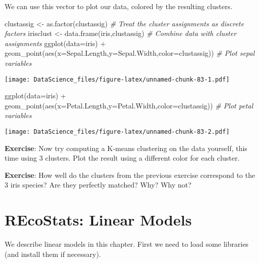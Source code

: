 \documentclass[
]{book}
\newenvironment{Shaded}{\begin{snugshade}}{\end{snugshade}}
\newcommand{\AttributeTok}[1]{\textcolor[rgb]{0.77,0.63,0.00}{#1}}
\newcommand{\CommentTok}[1]{\textcolor[rgb]{0.56,0.35,0.01}{\textit{#1}}}
\newcommand{\FunctionTok}[1]{\textcolor[rgb]{0.00,0.00,0.00}{#1}}
\newcommand{\NormalTok}[1]{#1}
\newcommand{\OtherTok}[1]{\textcolor[rgb]{0.56,0.35,0.01}{#1}}
\newcommand{\SpecialCharTok}[1]{\textcolor[rgb]{0.00,0.00,0.00}{#1}}
\begin{document}
We can use this vector to plot our data, colored by the resulting clusters.

\begin{Shaded}
\begin{Highlighting}[]
\NormalTok{clustassig }\OtherTok{\textless{}{-}} \FunctionTok{as.factor}\NormalTok{(clustassig) }\CommentTok{\# Treat the cluster assignments as discrete factors}
\NormalTok{irisclust }\OtherTok{\textless{}{-}} \FunctionTok{data.frame}\NormalTok{(iris,clustassig) }\CommentTok{\# Combine data with cluster assignments}
\FunctionTok{ggplot}\NormalTok{(}\AttributeTok{data=}\NormalTok{iris) }\SpecialCharTok{+} \FunctionTok{geom\_point}\NormalTok{(}\FunctionTok{aes}\NormalTok{(}\AttributeTok{x=}\NormalTok{Sepal.Length,}\AttributeTok{y=}\NormalTok{Sepal.Width,}\AttributeTok{color=}\NormalTok{clustassig)) }\CommentTok{\# Plot sepal variables}
\end{Highlighting}
\end{Shaded}

\texttt{[image: DataScience\_files/figure-latex/unnamed-chunk-83-1.pdf]}

\begin{Shaded}
\begin{Highlighting}[]
\FunctionTok{ggplot}\NormalTok{(}\AttributeTok{data=}\NormalTok{iris) }\SpecialCharTok{+} \FunctionTok{geom\_point}\NormalTok{(}\FunctionTok{aes}\NormalTok{(}\AttributeTok{x=}\NormalTok{Petal.Length,}\AttributeTok{y=}\NormalTok{Petal.Width,}\AttributeTok{color=}\NormalTok{clustassig)) }\CommentTok{\# Plot petal variables}
\end{Highlighting}
\end{Shaded}

\texttt{[image: DataScience\_files/figure-latex/unnamed-chunk-83-2.pdf]}

\textbf{Exercise}: Now try computing a K-means clustering on the data yourself, this time using 3 clusters. Plot the result using a different color for each cluster.

\textbf{Exercise}: How well do the clusters from the previous exercise correspond to the 3 iris species? Are they perfectly matched? Why? Why not?

\hypertarget{recostats-linear-models}{%
\chapter{REcoStats: Linear Models}\label{recostats-linear-models}}

We describe linear models in this chapter. First we need to load some libraries (and install them if necessary).
\end{document}
